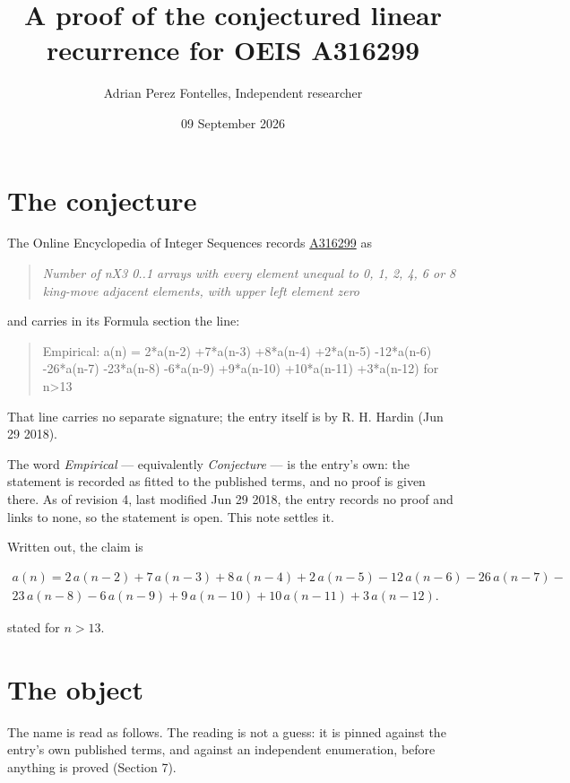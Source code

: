 \documentclass[11pt]{article}
\title{A proof of the conjectured linear recurrence for OEIS A316299}
\author{Adrian Perez Fontelles, Independent researcher}
\date{09 September 2026}
\theoremstyle{definition}
\begin{document}
\maketitle
\section{The conjecture}

The Online Encyclopedia of Integer Sequences records \href{https://oeis.org/A316299}{A316299} as

\begin{quote}\itshape Number of nX3 0..1 arrays with every element unequal to 0, 1, 2, 4, 6 or 8 king-move adjacent elements, with upper left element zero\end{quote}

and carries in its Formula section the line:

\begin{quote}\ttfamily Empirical: a(n) = 2*a(n-2) +7*a(n-3) +8*a(n-4) +2*a(n-5) -12*a(n-6) -26*a(n-7) -23*a(n-8) -6*a(n-9) +9*a(n-10) +10*a(n-11) +3*a(n-12) for n>13\end{quote}

That line carries no separate signature; the entry itself is by R. H. Hardin (Jun 29 2018).

The word {\itshape Empirical} --- equivalently {\itshape Conjecture} --- is the entry's own: the statement is recorded as fitted to the published terms, and no proof is given there. As of revision 4, last modified Jun 29 2018, the entry records no proof and links to none, so the statement is open. This note settles it.

Written out, the claim is

\begin{multline*} a(n) = 2\,a(n-2) + 7\,a(n-3) + 8\,a(n-4) + 2\,a(n-5) - 12\,a(n-6) - 26\,a(n-7) - \\ 23\,a(n-8) - 6\,a(n-9) + 9\,a(n-10) + 10\,a(n-11) + 3\,a(n-12). \end{multline*}

stated for $n > 13$.

\section{The object}

The name is read as follows. The reading is not a guess: it is pinned against the entry's own published terms, and against an independent enumeration, before anything is proved (Section 7).
\end{document}
